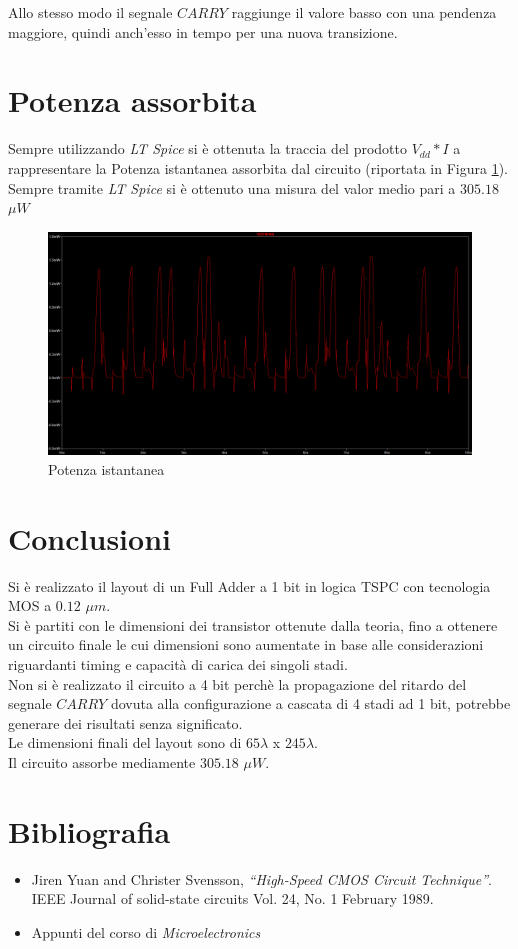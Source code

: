 \documentclass[11pt]{article} %
\begin{document}
Allo stesso modo il segnale $CARRY$ raggiunge il valore basso con una pendenza maggiore, quindi anch'esso in tempo per una nuova transizione.
\clearpage

\section{Potenza assorbita}
Sempre utilizzando \emph{LT Spice} si è ottenuta la traccia del prodotto $V_{dd}*I$ a rappresentare la Potenza istantanea assorbita dal circuito (riportata in Figura \ref{fig:Power}).
\newline
Sempre tramite \emph{LT Spice} si è ottenuto una misura del valor medio pari a $305.18 $  $\mu W$

 \begin{figure}[h!]
  \includegraphics[width=\linewidth]{power.png}
  \caption{Potenza istantanea}
  \label{fig:Power}
\end{figure}

\section{Conclusioni}
Si è realizzato il layout  di un Full Adder a 1 bit in logica TSPC con tecnologia MOS a $ 0.12 $ $\mu m$.  \\
Si è partiti con le dimensioni dei transistor ottenute dalla teoria, fino a ottenere un circuito finale le cui dimensioni sono aumentate in base alle considerazioni riguardanti  timing e capacità di carica dei singoli stadi.\\
Non si è realizzato il circuito a 4 bit perchè la propagazione del ritardo del segnale $CARRY$ dovuta alla configurazione a cascata di 4 stadi ad 1 bit, potrebbe generare dei risultati senza significato.\\
Le dimensioni finali del layout sono di $65\lambda$ x $245 \lambda$.\\
Il circuito assorbe mediamente  $305.18 $  $\mu W$.


\section{Bibliografia}
\begin{itemize}
  \item Jiren Yuan and Christer Svensson, \textit{“High-Speed CMOS Circuit Technique”}. IEEE Journal of solid-state circuits Vol. 24, No. 1 February 1989.
  \item Appunti del corso di \textit{Microelectronics}
\end{itemize}
\end{document}

